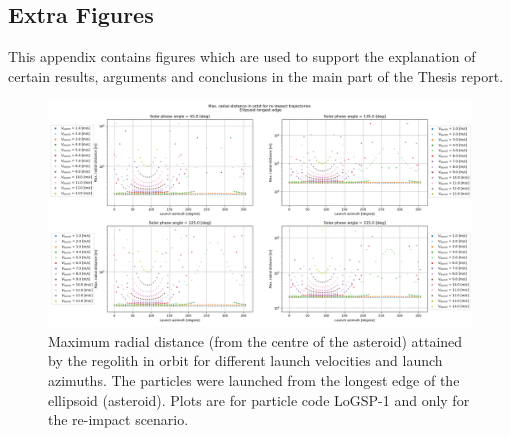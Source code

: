 \documentclass[print]{tudelft-report}
\begin{document}
\begin{appendices}
  \chapter{Extra Figures}
  This appendix contains figures which are used to support the explanation of certain results, arguments and conclusions in the main part of the Thesis report.
    \begin{figure}[htb]
    \centering
    \captionsetup{justification=centering}
    \includegraphics[angle=90, width=\textwidth, height=\textheight]{Results/Images/longest_edge_perturbations/3.2Density_1cmSize/maxAltitude_reimpactCase.png}
    \caption{Maximum radial distance (from the centre of the asteroid) attained by the regolith in orbit for different launch velocities and launch azimuths. The particles were launched from the longest edge of the ellipsoid (asteroid). Plots are for particle code LoGSP-1 and only for the re-impact scenario.}
    \label{fig:LoGSP_1_maxAltitude_reimpactscenario}
    \end{figure}
    \FloatBarrier
    \begin{figure}[htb]
    \centering
    \captionsetup{justification=centering}

\end{figure}
\end{appendices}
\end{document}
